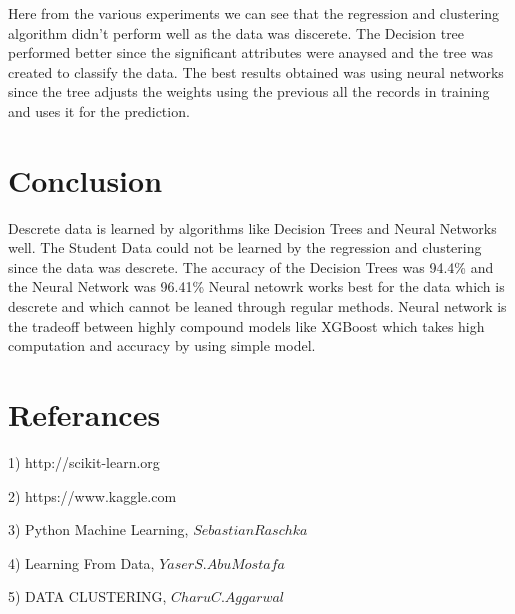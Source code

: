 \documentclass[conference,compsoc]{IEEEtran}
\begin{document}
 
 Here from the various experiments we can see that the regression and clustering algorithm didn’t perform well as the data was discerete. The Decision tree performed better since the significant attributes were anaysed and the tree was created to classify the data. The best results obtained was using neural networks since the tree adjusts the weights using the previous all the records in training and uses it for the prediction.
 


\section{Conclusion}

Descrete data is learned by algorithms like Decision Trees and Neural Networks well. The Student Data could not be learned by the regression and clustering since the data was descrete. The accuracy of the Decision Trees was 94.4\% and the Neural Network was 96.41\% Neural netowrk works best for the data which is descrete and which cannot be leaned through regular methods. Neural network is the tradeoff between highly compound models like XGBoost which takes high computation and accuracy by using simple model.


\section{Referances}

1)	http://scikit-learn.org

2)	https://www.kaggle.com

3)	Python Machine Learning, $Sebastian Raschka$

4)	Learning From Data, $Yaser S. Abu Mostafa$

5)	DATA CLUSTERING, $Charu C. Aggarwal$

\ifCLASSOPTIONcompsoc
\fi





\end{document}
